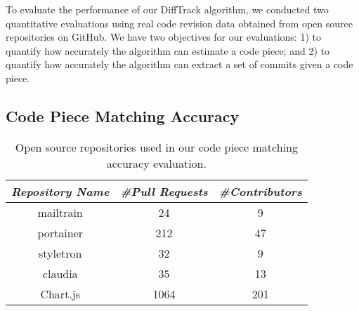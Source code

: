 To evaluate the performance of our DiffTrack algorithm, we conducted two quantitative evaluations using real code revision data obtained from open source repositories on GitHub.
We have two objectives for our evaluations: 1) to quantify how accurately the algorithm can estimate a code piece; and 2) to quantify how accurately the algorithm can extract a set of commits given a code piece.

\subsection{Code Piece Matching Accuracy}


\begin{table}[tbp]
	\centering
	\begin{tabular}{ c c c }
	   \small\textit{Repository Name} & \small\textit{\#Pull Requests} & \small\textit{\#Contributors} \\
       \midrule
		mailtrain & 24 & 9 \\
      portainer & 212 & 47 \\
      styletron & 32 & 9 \\
      claudia & 35 & 13 \\
      Chart.js & 1064 & 201 \\
	\end{tabular}
    \caption{Open source repositories used in our code piece matching accuracy evaluation.}
	\label{table:repositories}
\end{table}



